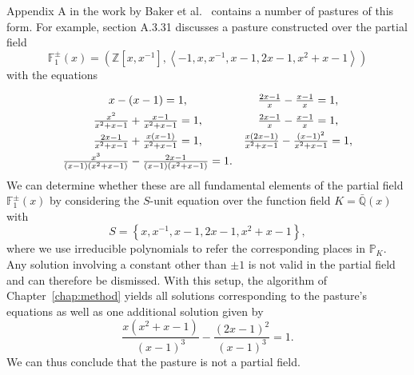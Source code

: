 Appendix A in the work by Baker et al.~\cite{baker-2023-foundations-of-matroids} contains a number of pastures of this form. For example, section A.3.31 discusses a pasture constructed over the partial field
\[\mathbb{F}_{1}^{\pm}(x) = \left( \mathbb{Z} \left[ x, x^{-1} \right], \left\langle -1, x, x^{-1}, x -1, 2x - 1, x^{2} + x - 1 \right\rangle \right)\]
with the equations
\begin{equation*}
  \def\arraystretch{1.5}
  \begin{array}{cc}
    x - (x - 1) = 1,                                                                  & \frac{2x - 1}{x} - \frac{x - 1}{x} = 1,                                    \\
    \frac{x^{2}}{x^{2} + x - 1} + \frac{x - 1}{x^{2} + x - 1} = 1,                    & \frac{2x - 1}{x} - \frac{x - 1}{x} = 1,                                    \\
    \frac{2x - 1}{x^{2} + x - 1} + \frac{x(x - 1)}{x^{2} + x - 1} = 1,                & \frac{x(2x - 1)}{x^{2} + x - 1} - \frac{{(x - 1)}^{2}}{x^{2} + x - 1} = 1, \\
    \frac{x^{3}}{(x - 1)(x^{2} + x - 1)} - \frac{2x - 1}{(x - 1)(x^{2} + x - 1)} = 1. &
  \end{array}
\end{equation*}
We can determine whether these are all fundamental elements of the partial field \(\mathbb{F}_{1}^{\pm}(x)\) by considering the \(S\)-unit equation over the function field \(K = \bar{\mathbb{Q}}(x)\) with
\[S = \left\{ x, x^{-1}, x -1, 2x - 1, x^{2} + x - 1 \right\},\]
where we use irreducible polynomials to refer the corresponding places in \(\mathbb{P}_{K}\). Any solution involving a constant other than \(\pm 1\) is not valid in the partial field and can therefore be dismissed. With this setup, the algorithm of Chapter~\ref{chap:method} yields all solutions corresponding to the pasture's equations as well as one additional solution given by
\[\frac{x(x^{2} + x - 1)}{{(x - 1)}^{3}} - \frac{{(2x - 1)}^{2}}{{(x - 1)}^{3}} = 1.\]
We can thus conclude that the pasture is not a partial field.
